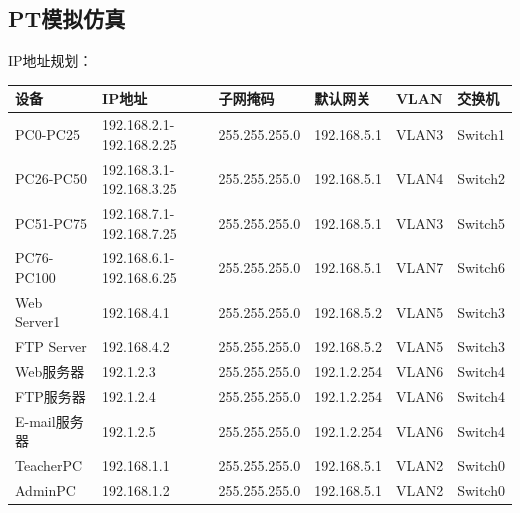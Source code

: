 \documentclass{imutthesis}
\begin{document}
\subsection{PT模拟仿真}

IP地址规划：
\begin{table}[h]%
    \centering
    \begin{tabular}{p{2.6cm}<{\centering}p{4.4cm}<{\centering}p{3.0cm}<{\centering}p{2.0cm}<{\centering}p{2.0cm}<{\centering}p{2.0cm}}
    \hline
    设备 & IP地址 & 子网掩码 & 默认网关 & VLAN & 交换机  \\ %
    \hline
    PC0-PC25  & 192.168.2.1-192.168.2.25 & 255.255.255.0 & 192.168.5.1 & VLAN3 & Switch1\\ 
    PC26-PC50 & 192.168.3.1-192.168.3.25 & 255.255.255.0 & 192.168.5.1 & VLAN4 & Switch2\\ 
    PC51-PC75 & 192.168.7.1-192.168.7.25 & 255.255.255.0 & 192.168.5.1 & VLAN3 & Switch5\\ 
    PC76-PC100 & 192.168.6.1-192.168.6.25 & 255.255.255.0 & 192.168.5.1 & VLAN7 & Switch6\\ 
    Web Server1 & 192.168.4.1 & 255.255.255.0 & 192.168.5.2 & VLAN5 & Switch3\\ 
    FTP Server & 192.168.4.2& 255.255.255.0 & 192.168.5.2 & VLAN5 & Switch3\\ 
    Web服务器 & 192.1.2.3& 255.255.255.0 & 192.1.2.254 & VLAN6 & Switch4\\ 
    FTP服务器 & 192.1.2.4& 255.255.255.0 & 192.1.2.254 & VLAN6 & Switch4\\ 
    E-mail服务器 & 192.1.2.5& 255.255.255.0 & 192.1.2.254 & VLAN6 & Switch4\\ 
    TeacherPC & 192.168.1.1& 255.255.255.0 & 192.168.5.1 & VLAN2 & Switch0\\ 
    AdminPC & 192.168.1.2& 255.255.255.0 & 192.168.5.1 & VLAN2 & Switch0\\ 
    \hline
    \end{tabular}
\end{table}
\newpage
\end{document}
